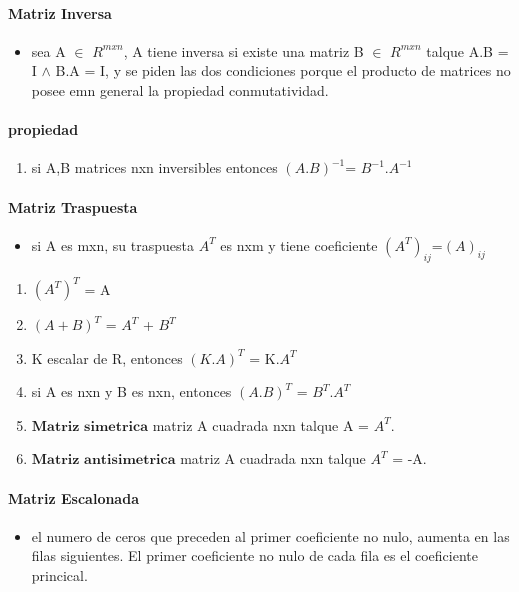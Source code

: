 \documentclass[a4paper]{article}
\begin{document}
\paragraph{Matriz Inversa}
\begin{itemize}
	\item sea A $\in$ $R^{mxn}$, A tiene inversa si existe una matriz B $\in$ $R^{mxn}$ talque A.B = I $\wedge$ B.A = I, y se piden las dos condiciones porque el producto de matrices no posee emn general la propiedad conmutatividad.	
\end{itemize}

\paragraph{propiedad}
\begin{enumerate}
	\item si A,B matrices nxn inversibles entonces $(A.B)^{-1}$= $B^{-1}$.$A^{-1}$
\end{enumerate}

\paragraph{Matriz Traspuesta}
\begin{itemize}
	\item si A es mxn, su traspuesta $A^T$ es nxm y tiene coeficiente $(A^T)_{ij}$=$(A)_{ij}$
\end{itemize}

\begin{enumerate}
	\item $(A^T)^T$ = A
	\item $(A + B)^T$ = $A^T$ + $B^T$
	\item K escalar de R, entonces $(K.A)^T$ = K.$A^T$
	\item si A es nxn y B es nxn, entonces $(A.B)^T$ = $B^T$.$A^T$
	
	
	\item $\textbf{Matriz simetrica}$ matriz A cuadrada nxn talque A = $A^T$.
	\item $\textbf{Matriz antisimetrica}$ matriz A cuadrada nxn talque $A^T$ = -A.
\end{enumerate}

\paragraph{Matriz Escalonada}
\begin{itemize}
	\item el numero de ceros que preceden al primer coeficiente no nulo, aumenta en las filas siguientes. El primer coeficiente no nulo de cada fila es el coeficiente princical.
\end{itemize}
		
\end{document}
